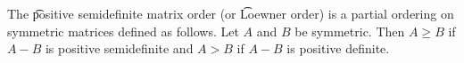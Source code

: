


The \t{positive semidefinite matrix order} (or \t{Loewner order}) is a partial ordering on symmetric matrices defined as follows.
Let $A$ and $B$ be symmetric.
Then $A \geq B$ if $A - B$ is positive semidefinite and $A > B$ if $A - B$ is positive definite.


\blankpage
